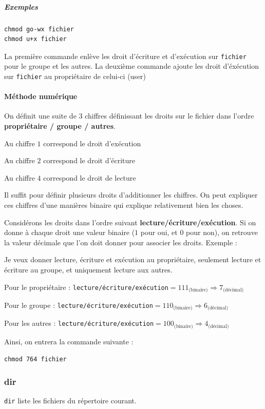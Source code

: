 \documentclass[a4paper,twoside]{article}
\begin{document}
\subparagraph{Exemples}

\begin{verbatim}
chmod go-wx fichier
chmod u+x fichier
\end{verbatim}

La première commande enlève les droit d'écriture et d'exécution sur \texttt{fichier} pour le groupe et les autres. La deuxième commande ajoute les droit d'éxécution sur \texttt{fichier} au propriétaire de celui-ci (user)

\paragraph{Méthode numérique}
On définit une suite de 3 chiffres définissant les droits sur le fichier dans l'ordre \textbf{propriétaire / groupe / autres}.

Au chiffre $1$ correspond le droit d'exécution

Au chiffre $2$ correspond le droit d'écriture

Au chiffre $4$ correspond le droit de lecture

Il suffit pour définir plusieurs droits d'additionner les chiffres. On peut expliquer ces chiffres d'une manières binaire qui explique relativement bien les choses.

Considérons les droits dans l'ordre suivant \textbf{lecture/écriture/exécution}. Si on donne à chaque droit une valeur binaire ($1$ pour oui, et $0$ pour non), on retrouve la valeur décimale que l'on doit donner pour associer les droits. Exemple :

Je veux donner lecture, écriture et exécution au propriétaire, seulement lecture et écriture au groupe, et uniquement lecture aux autres.

Pour le propriétaire : \texttt{lecture/écriture/exécution}$=111_{\text{(binaire)}}\Rightarrow 7_{\text{(décimal)}}$

Pour le groupe : \texttt{lecture/écriture/exécution}$=110_{\text{(binaire)}}\Rightarrow 6_{\text{(décimal)}}$

Pour les autres : \texttt{lecture/écriture/exécution}$=100_{\text{(binaire)}}\Rightarrow 4_{\text{(décimal)}}$


Ainsi, on entrera la commande suivante :

\begin{verbatim}
chmod 764 fichier
\end{verbatim}

\subsubsection{dir}
\verb|dir| liste les fichiers du répertoire courant.
\end{document}

